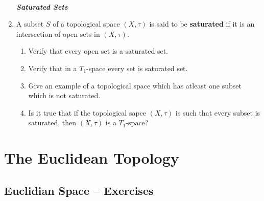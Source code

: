 \documentclass[10pt,a4paper]{report}
\newcommand{\SPECIAL}[1]{\begin{center}
	{\Large \textbf{\textit{\\#1}} }
\end{center}
}
\begin{document}
\begin{enumerate}
\SPECIAL{Saturated Sets}

\item A subset $S$ of a topological space $(X,\tau)$ is said to be \textbf{saturated} if it is an intersection of open sets in $(X, \tau)$.
\begin{enumerate}[label=(\roman*)]
	\item Verify that every open set is a saturated set.
	\item Verify that in a $T_1$-space every set is saturated set.
	\item Give an example of a topological space which has atleast one subset which is not saturated.
	\item Is it true that if the topological sapce $(X, \tau)$ is such that every subset is saturated, then $(X,\tau)$ is a $T_1$-space?
\end{enumerate}
\end{enumerate} %

\chapter{The Euclidean Topology}
\section{Euclidian Space -- Exercises}
\end{document}
